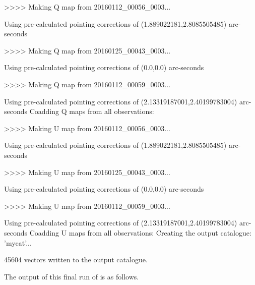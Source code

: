 \begin{terminalv}
>>>>   Making Q map from 20160112_00056_0003...

   Using pre-calculated pointing corrections of (1.889022181,2.8085505485) arc-seconds

>>>>   Making Q map from 20160125_00043_0003...

   Using pre-calculated pointing corrections of (0.0,0.0) arc-seconds

>>>>   Making Q map from 20160112_00059_0003...

   Using pre-calculated pointing corrections of (2.13319187001,2.40199783004) arc-seconds
Coadding Q maps from all observations:

>>>>   Making U map from 20160112_00056_0003...

   Using pre-calculated pointing corrections of (1.889022181,2.8085505485) arc-seconds

>>>>   Making U map from 20160125_00043_0003...

   Using pre-calculated pointing corrections of (0.0,0.0) arc-seconds

>>>>   Making U map from 20160112_00059_0003...

   Using pre-calculated pointing corrections of (2.13319187001,2.40199783004) arc-seconds
Coadding U maps from all observations:
Creating the output catalogue: 'mycat'...

45604 vectors written to the output catalogue.
\end{terminalv}


The output of this final run of  is as follows.

